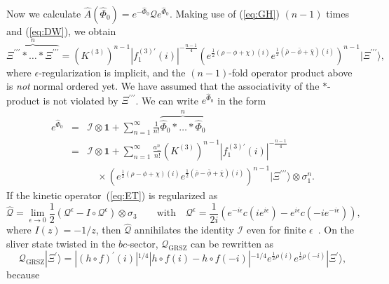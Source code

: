 \documentclass[a4paper,12pt]{article}
\newcommand{\cI}{\mathcal{I}}
\newcommand{\cQ}{\mathcal{Q}}
\newcommand{\Qmid}{\cQ_{\mathrm{GRSZ}}}
\newcommand{\tp}{\prime\prime\prime}
\begin{document}
Now we calculate $\widehat{A}(\widehat{\Phi}_0)=e^{-\widehat{\Phi}_0}\widehat{\cQ}e^{\widehat{\Phi}_0}$. 
Making use of (\ref{eq:GH}) $(n-1)$ times and (\ref{eq:DW}), we obtain 
\begin{equation}
\overbrace{\Xi^{\tp}*\ldots *\Xi^{\tp}}^n=(K^{(3)})^{n-1}
|f^{(3)\prime}_1(i)|^{-\frac{n-1}{4}}\left(e^{\frac{1}{2}
(\rho-\phi+\chi)(i)}e^{\frac{1}{2}(\bar{\rho}-\bar{\phi}+\bar{\chi})(i)}\right)^{n-1}|\Xi^{\tp}\rangle, 
\label{eq:M92C}
\end{equation}
where $\epsilon$-regularization is implicit, and the $(n-1)$-fold operator product above is \textit{not} 
normal ordered yet. We have assumed that the associativity of the $*$-product is not 
violated by $\Xi^{\tp}$. We can write $e^{\widehat{\Phi}_0}$ in the form 
\begin{eqnarray}
e^{\widehat{\Phi}_0}&=&\cI\otimes\mathbf{1}+\sum_{n=1}^{\infty}\frac{1}{n!}\overbrace{\widehat{\Phi}_0
*\ldots *\widehat{\Phi}_0}^n \nonumber \\
&=&\cI\otimes\mathbf{1}+\sum_{n=1}^{\infty}\frac{a_-^n}{n!}(K^{(3)})^{n-1}
|f^{(3)\prime}_1(i)|^{-\frac{n-1}{4}} 
\label{eq:GX} \\ & &{}\quad\times\left(e^{\frac{1}{2}(\rho-\phi+\chi)(i)}e^{\frac{1}{2}(\bar{\rho}
-\bar{\phi}+\bar{\chi})(i)}\right)^{n-1}
|\Xi^{\tp}\rangle\otimes\sigma_1^n. \nonumber 
\end{eqnarray}
If the kinetic operator~(\ref{eq:ET}) is regularized as
\begin{equation}
\widehat{\cQ}=\lim_{\epsilon\to 0}\frac{1}{2}\left(\cQ^{\epsilon}-I\circ \cQ^{\epsilon}\right)\otimes
\sigma_3 \qquad 
\mathrm{with} \quad \cQ^{\epsilon}=\frac{1}{2i}\left(e^{-i\epsilon}c(ie^{i\epsilon})-e^{i\epsilon}
c(-ie^{-i\epsilon})\right), \label{eq:CE}
\end{equation}
where $I(z)=-1/z$, then $\widehat{\cQ}$ annihilates 
the identity $\cI$ even for finite $\epsilon$~\cite{GRSZ1,KiOh}. 
On the sliver state twisted in the $bc$-sector, $\Qmid$ can be rewritten as~\cite{GRSZ1} 
\begin{equation}
\Qmid|\Xi^{\prime}\rangle=|(h\circ f)^{\prime}(i)|^{1/4}|h\circ f(i)-h\circ f(-i)|^{-1/4}
e^{\frac{1}{2}\rho(i)}e^{\frac{1}{2}\rho(-i)}|\Xi^{\prime}\rangle, \label{eq:RH}
\end{equation}
because 
\end{document}
